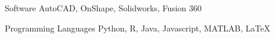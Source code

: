 

\begin{cvskills}

  \cvskill
    {Software} %
    {AutoCAD, OnShape, Solidworks, Fusion 360} %



  \cvskill
    {Programming Languages} %
    {Python, R, Java, Javascript, MATLAB, LaTeX} %


\end{cvskills}